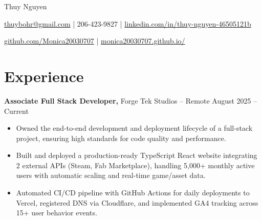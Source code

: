 \documentclass[11pt]{article}       %
\begin{document}
\centerline{\Huge Thuy Nguyen}

\vspace{5pt}

\centerline{\href{mailto:thuybohr@gmail.com}{thuybohr@gmail.com} | 206-423-9827 |
\href{https://www.linkedin.com/in/thuy-nguyen-46505121b/}{linkedin.com/in/thuy-nguyen-46505121b}}

\centerline{\href{https://github.com/Monica20030707}{github.com/Monica20030707} | 
\href{https://monica20030707.github.io/}{monica20030707.github.io/}} 

\vspace{-9pt}

\section*{Experience}

\textbf{Associate Full Stack Developer,} {Forge Tek Studios} -- Remote \hfill August 2025 -- Current 
\vspace{-9pt}
\begin{itemize}
  \item Owned the end-to-end development and deployment lifecycle of a full-stack project, ensuring high standards for code quality and performance.
  \item Built and deployed a production-ready TypeScript React website integrating 2 external APIs (Steam, Fab Marketplace), handling 5,000+ monthly active users with automatic scaling and real-time game/asset data.
  \item Automated CI/CD pipeline with GitHub Actions for daily deployments to Vercel, registered DNS via Cloudflare, and implemented GA4 tracking across 15+ user behavior events.
\end{itemize}
\end{document}
